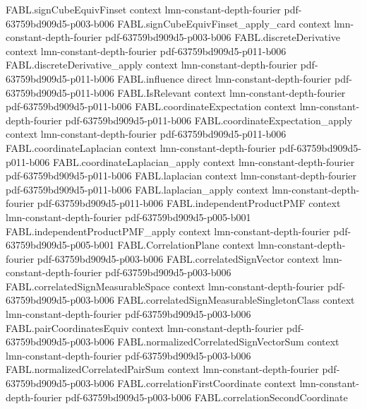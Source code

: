 \begin{theorem}
\proofstep
  {FABL.signCubeEquivFinset}
  {context}
  {lmn-constant-depth-fourier}
  {pdf-63759bd909d5-p003-b006}
\proofstep
  {FABL.signCubeEquivFinset_apply_card}
  {context}
  {lmn-constant-depth-fourier}
  {pdf-63759bd909d5-p003-b006}
\proofstep
  {FABL.discreteDerivative}
  {context}
  {lmn-constant-depth-fourier}
  {pdf-63759bd909d5-p011-b006}
\proofstep
  {FABL.discreteDerivative_apply}
  {context}
  {lmn-constant-depth-fourier}
  {pdf-63759bd909d5-p011-b006}
\proofstep
  {FABL.influence}
  {direct}
  {lmn-constant-depth-fourier}
  {pdf-63759bd909d5-p011-b006}
\proofstep
  {FABL.IsRelevant}
  {context}
  {lmn-constant-depth-fourier}
  {pdf-63759bd909d5-p011-b006}
\proofstep
  {FABL.coordinateExpectation}
  {context}
  {lmn-constant-depth-fourier}
  {pdf-63759bd909d5-p011-b006}
\proofstep
  {FABL.coordinateExpectation_apply}
  {context}
  {lmn-constant-depth-fourier}
  {pdf-63759bd909d5-p011-b006}
\proofstep
  {FABL.coordinateLaplacian}
  {context}
  {lmn-constant-depth-fourier}
  {pdf-63759bd909d5-p011-b006}
\proofstep
  {FABL.coordinateLaplacian_apply}
  {context}
  {lmn-constant-depth-fourier}
  {pdf-63759bd909d5-p011-b006}
\proofstep
  {FABL.laplacian}
  {context}
  {lmn-constant-depth-fourier}
  {pdf-63759bd909d5-p011-b006}
\proofstep
  {FABL.laplacian_apply}
  {context}
  {lmn-constant-depth-fourier}
  {pdf-63759bd909d5-p011-b006}
\proofstep
  {FABL.independentProductPMF}
  {context}
  {lmn-constant-depth-fourier}
  {pdf-63759bd909d5-p005-b001}
\proofstep
  {FABL.independentProductPMF_apply}
  {context}
  {lmn-constant-depth-fourier}
  {pdf-63759bd909d5-p005-b001}
\proofstep
  {FABL.CorrelationPlane}
  {context}
  {lmn-constant-depth-fourier}
  {pdf-63759bd909d5-p003-b006}
\proofstep
  {FABL.correlatedSignVector}
  {context}
  {lmn-constant-depth-fourier}
  {pdf-63759bd909d5-p003-b006}
\proofstep
  {FABL.correlatedSignMeasurableSpace}
  {context}
  {lmn-constant-depth-fourier}
  {pdf-63759bd909d5-p003-b006}
\proofstep
  {FABL.correlatedSignMeasurableSingletonClass}
  {context}
  {lmn-constant-depth-fourier}
  {pdf-63759bd909d5-p003-b006}
\proofstep
  {FABL.pairCoordinatesEquiv}
  {context}
  {lmn-constant-depth-fourier}
  {pdf-63759bd909d5-p003-b006}
\proofstep
  {FABL.normalizedCorrelatedSignVectorSum}
  {context}
  {lmn-constant-depth-fourier}
  {pdf-63759bd909d5-p003-b006}
\proofstep
  {FABL.normalizedCorrelatedPairSum}
  {context}
  {lmn-constant-depth-fourier}
  {pdf-63759bd909d5-p003-b006}
\proofstep
  {FABL.correlationFirstCoordinate}
  {context}
  {lmn-constant-depth-fourier}
  {pdf-63759bd909d5-p003-b006}
\proofstep
  {FABL.correlationSecondCoordinate}

\end{theorem}
